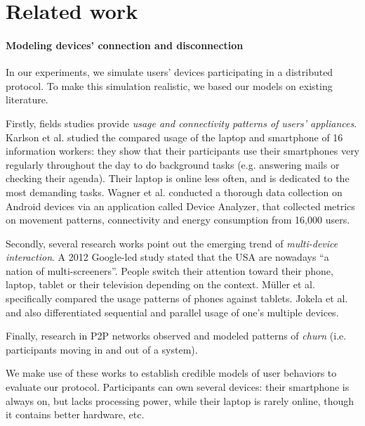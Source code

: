 \section{Related work}%
\label{RelatedWork}


\paragraph*{Modeling devices' connection and disconnection} 
In our experiments, we simulate users' devices participating in a distributed protocol.
To make this simulation realistic, we based our models on existing literature. 

Firstly, fields studies provide \emph{usage and connectivity patterns of users' appliances}.
Karlson et al. \cite{Karlson_Meyers_Jacobs_Johns_Kane_2009} studied the compared usage of the laptop and smartphone of 16 information workers: 
they show that their participants use their smartphones very regularly throughout the day to do background tasks (e.g. answering mails or checking their agenda).
Their laptop is online less often, and is dedicated to the most demanding tasks.
Wagner et al. \cite{Wagner_Rice_Beresford_2013} conducted a thorough data collection on Android devices via an application called Device Analyzer, that collected metrics on movement patterns, connectivity and energy consumption from 16,000 users.

Secondly, several research works point out the emerging trend of \emph{multi-device interaction}.
A 2012 Google-led study \cite{google2012} stated that the USA are nowadays ``a nation of multi-screeners''.
People switch their attention toward their phone, laptop, tablet or their television depending on the context.
M\"uller et al. \cite{Muller_Gove_Webb_Cheang_2015} specifically compared the usage patterns of phones against tablets.
Jokela et al. \cite{Jokela_Ojala_Olsson_2015} and \cite{google2012} also differentiated sequential and parallel usage of one's multiple devices.

Finally, research in P2P networks observed \cite{Stutzbach_Rejaie_2006} and modeled \cite{Yao_Leonard_Wang_Loguinov_2006} patterns of \emph{churn} (i.e. participants moving in and out of a system).

We make use of these works to establish credible models of user behaviors to evaluate our protocol. 
Participants can own several devices: their smartphone is always on, but lacks processing power, while their laptop is rarely online, though it contains better hardware, etc. 


